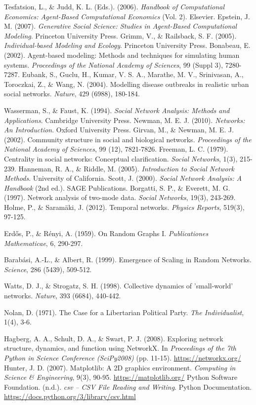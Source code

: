  Tesfatsion, L., \& Judd, K. L. (Eds.). (2006). \textit{Handbook of Computational Economics: Agent-Based Computational Economics} (Vol. 2). Elsevier.
 Epstein, J. M. (2007). \textit{Generative Social Science: Studies in Agent-Based Computational Modeling}. Princeton University Press.
 Grimm, V., \& Railsback, S. F. (2005). \textit{Individual-based Modeling and Ecology}. Princeton University Press.
 Bonabeau, E. (2002). Agent-based modeling: Methods and techniques for simulating human systems. \textit{Proceedings of the National Academy of Sciences}, 99 (Suppl 3), 7280-7287.
 Eubank, S., Guclu, H., Kumar, V. S. A., Marathe, M. V., Srinivasan, A., Toroczkai, Z., \& Wang, N. (2004). Modelling disease outbreaks in realistic urban social networks. \textit{Nature}, 429 (6988), 180-184.

 Wasserman, S., \& Faust, K. (1994). \textit{Social Network Analysis: Methods and Applications}. Cambridge University Press.
 Newman, M. E. J. (2010). \textit{Networks: An Introduction}. Oxford University Press.
 Girvan, M., \& Newman, M. E. J. (2002). Community structure in social and biological networks. \textit{Proceedings of the National Academy of Sciences}, 99 (12), 7821-7826.
 Freeman, L. C. (1979). Centrality in social networks: Conceptual clarification. \textit{Social Networks}, 1(3), 215-239.
 Hanneman, R. A., \& Riddle, M. (2005). \textit{Introduction to Social Network Methods}. University of California.
 Scott, J. (2000). \textit{Social Network Analysis: A Handbook} (2nd ed.). SAGE Publications.
 Borgatti, S. P., \& Everett, M. G. (1997). Network analysis of two-mode data. \textit{Social Networks}, 19(3), 243-269.
 Holme, P., \& Saramäki, J. (2012). Temporal networks. \textit{Physics Reports}, 519(3), 97-125.

 Erdős, P., \& Rényi, A. (1959). On Random Graphs I. \textit{Publicationes Mathematicae}, 6, 290-297.

 Barabási, A.-L., \& Albert, R. (1999). Emergence of Scaling in Random Networks. \textit{Science}, 286 (5439), 509-512.

 Watts, D. J., \& Strogatz, S. H. (1998). Collective dynamics of 'small-world' networks. \textit{Nature}, 393 (6684), 440-442.

 Nolan, D. (1971). The Case for a Libertarian Political Party. \textit{The Individualist}, 1(4), 3-6.

 Hagberg, A. A., Schult, D. A., \& Swart, P. J. (2008). Exploring network structure, dynamics, and function using NetworkX. In \textit{Proceedings of the 7th Python in Science Conference (SciPy2008)} (pp. 11-15). \url{https://networkx.org/}
 Hunter, J. D. (2007). Matplotlib: A 2D graphics environment. \textit{Computing in Science \& Engineering}, 9(3), 90-95. \url{https://matplotlib.org/}
 Python Software Foundation. (n.d.). \textit{csv – CSV File Reading and Writing}. Python Documentation. \url{https://docs.python.org/3/library/csv.html}

